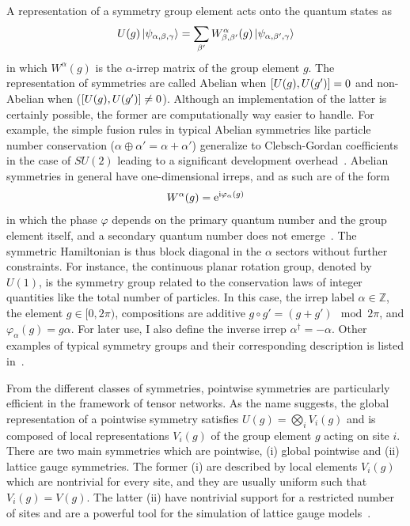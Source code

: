 A representation of a symmetry group element acts onto the quantum states as
\begin{align}
    U(g)\ket{\psi_{\alpha,\beta,\gamma}} = \sum_{\beta'}W^{\alpha}_{\beta,\beta'}(g)\ket{\psi_{\alpha,\beta',\gamma}}
\end{align}
in which $W^\alpha(g)$ is the $\alpha$-irrep matrix of the group element $g$.
The representation of symmetries are called Abelian when $\left[ U(g),U(g') \right]=0$ and non-Abelian when ($\left[ U(g),U(g') \right]\neq0$).
Although an implementation of the latter is certainly possible, the former are computationally way easier to handle.
For example, the simple fusion rules in typical Abelian symmetries like particle number conservation ($\alpha\oplus\alpha'=\alpha+\alpha'$) generalize to Clebsch-Gordan coefficients in the case of $SU(2)$ leading to a significant development overhead~\cite{Schmoll2020}.
Abelian symmetries in general have one-dimensional irreps, and as such are of the form
\begin{align}
    W^\alpha(g) = \mathrm e^{\mathrm i\varphi_\alpha(g)}
\end{align}
in which the phase $\varphi$ depends on the primary quantum number and the group element itself, and a secondary quantum number does not emerge~\cite{Silvi2019}.
The symmetric Hamiltonian is thus block diagonal in the $\alpha$ sectors without further constraints.
For instance, the continuous planar rotation group, denoted by $U(1)$, is the symmetry group related to the conservation laws of integer quantities like the total number of particles.
In this case, the irrep label $\alpha\in\mathds Z$, the element $g\in[0,2\pi)$, compositions are additive $g\circ g' = {(g+g')\mod 2\pi}$, and $\varphi_\alpha(g) = g\alpha$.
For later use, I also define the inverse irrep $\alpha^\dag=-\alpha$.
Other examples of typical symmetry groups and their corresponding description is listed in~\cite{Silvi2019}.

From the different classes of symmetries, pointwise symmetries are particularly efficient in the framework of tensor networks.
As the name suggests, the global representation of a pointwise symmetry satisfies $U(g)=\bigotimes_i V_i(g)$ and is composed of local representations $V_i(g)$ of the group element $g$ acting on site $i$.
There are two main symmetries which are pointwise, (i) global pointwise and (ii) lattice gauge symmetries.
The former (i) are described by local elements $V_i(g)$ which are nontrivial for every site, and they are usually uniform such that $V_i(g)=V(g)$.
The latter (ii) have nontrivial support for a restricted number of sites and are a powerful tool for the simulation of lattice gauge models~\cite{Banuls2014,Buyens2015}.

